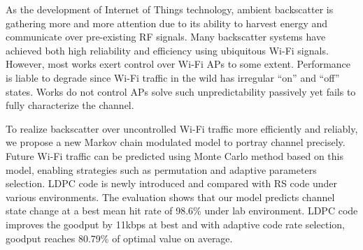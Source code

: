 \begin{enabstract}
%
As the development of Internet of Things technology, ambient backscatter is gathering more and
more attention due to its ability to harvest energy and communicate over pre-existing RF signals.
Many backscatter systems have achieved both high reliability and efficiency using ubiquitous Wi-Fi signals. However, most works exert control over Wi-Fi APs to some extent. Performance is liable to degrade since Wi-Fi traffic in the wild has irregular “on” and “off” states. Works do not control APs solve such unpredictability passively yet fails to fully characterize the channel.

To realize backscatter over uncontrolled Wi-Fi traffic more efficiently and reliably, we propose a new Markov chain modulated model to portray channel precisely. Future Wi-Fi traffic can be predicted using Monte Carlo method based on this model, enabling strategies such as permutation and adaptive parameters selection. LDPC code is newly introduced and compared with RS code under various environments. The evaluation shows that our model predicts channel state change at a best mean hit rate of 98.6\% under lab environment. LDPC code improves the goodput by 11kbps at best and with adaptive code rate selection, goodput reaches 80.79\% of optimal value on average.
\end{enabstract}
